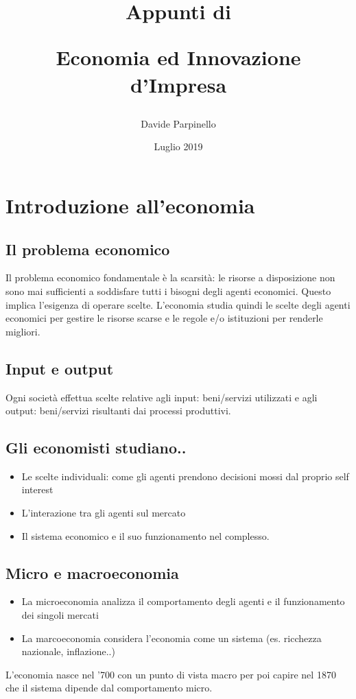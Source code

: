 \documentclass{report}
\begin{document}
	
	\author{Davide Parpinello}
	\title{%
			\begin{Large}
				Appunti di\\
			\end{Large}
		Economia ed Innovazione d'Impresa}
	\date{Luglio 2019}
	\maketitle
	
	\tableofcontents
	
	\chapter{Introduzione all'economia}
	\section{Il problema economico}
	Il problema economico fondamentale è la scarsità: le risorse a disposizione non sono mai sufficienti a soddisfare tutti i bisogni degli agenti economici.
	Questo implica l'esigenza di operare scelte. L'economia studia quindi le scelte degli agenti economici per gestire le risorse scarse e le regole e/o istituzioni per renderle migliori.
	\section{Input e output}
	Ogni società effettua scelte relative agli input: beni/servizi utilizzati e agli output: beni/servizi risultanti dai processi produttivi.
	\section{Gli economisti studiano..}
	\begin{itemize}
		\item Le scelte individuali: come gli agenti prendono decisioni mossi dal proprio self interest
		\item L'interazione tra gli agenti sul mercato
		\item Il sistema economico e il suo funzionamento nel complesso.
	\end {itemize}
	\section{Micro e macroeconomia}
	\begin{itemize}
		\item La microeconomia analizza il comportamento degli agenti e il funzionamento dei singoli mercati
		\item La marcoeconomia considera l'economia come un sistema (es. ricchezza nazionale, inflazione..)
	\end {itemize}
	L'economia nasce nel '700 con un punto di vista macro per poi capire nel 1870 che il sistema dipende dal comportamento micro.
\end{document}
